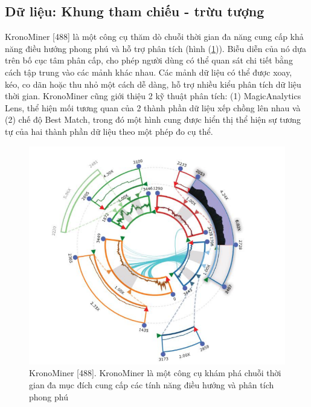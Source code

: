 \subsection{Dữ liệu: Khung tham chiếu - trừu tượng}
KronoMiner [488] là một công cụ thăm dò chuỗi thời gian đa năng cung cấp khả năng điều hướng phong phú và hỗ trợ phân tích (hình (\ref{fig:f7.3})). Biễu diễn của nó dựa trên bố cục tâm phân cấp, cho phép người dùng có thể  quan sát chi tiết bằng cách tập trung vào các mảnh khác nhau. Các mảnh dữ liệu có thể được xoay, kéo, co dãn hoặc thu nhỏ một cách dễ dàng, hỗ trợ nhiều kiểu phân tích dữ liệu thời gian. KronoMiner cũng giới thiệu 2 kỹ thuật phân tích: (1) MagicAnalytics Lens, thể hiện mối tương quan của 2 thành phần dữ liệu xếp chồng lên nhau và (2) chế độ Best Match, trong đó một hình cung được hiển thị thể hiện sự tương tự của hai thành phần dữ liệu theo một phép đo cụ thể. 
\begin{figure}[H] %
    \centering %
    \includegraphics[width=1\textwidth]{assets/fig_7_3.png} 
    \caption{KronoMiner [488]. KronoMiner là một công cụ khám phá chuỗi thời gian đa mục đích cung cấp các tính năng điều hướng và phân tích phong phú} %
    \label{fig:f7.3}
\end{figure}